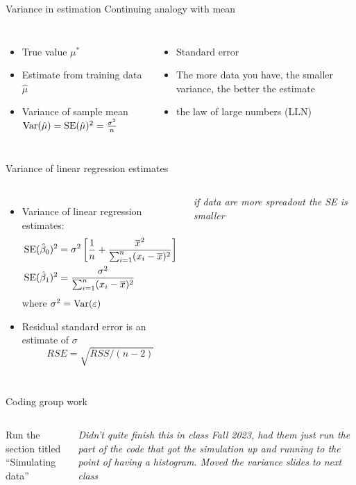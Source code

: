 \documentclass[aspectratio=169,usenames,dvipsnames]{beamer}
\newcommand{\InstructorNotes}[1]{\textit{\color{orange}#1}}
\newcommand{\InstructorList}[1]{
\begin{itemize}
	\color{orange}
	#1
\end{itemize}
}
\begin{document}
\begin{frame}[t]{Variance in estimation}
	{Continuing analogy with mean}

\begin{columns}
\centering

\begin{itemize}
	\item True value $\mu^*$
	\item Estimate from training data $\hat \mu$
	\item Variance of sample mean $\mathrm{Var}(\hat \mu) = \mathrm{SE}(\hat \mu)^2 = \frac{\sigma^2}{n}$
	\end{itemize}
\InstructorList{
  \item Standard error 
  \item The more data you have, the smaller variance, the better the estimate 
  \item the law of large numbers (LLN)
}
\end{columns}

\end{frame}
\begin{frame}[t]{Variance of linear regression estimates }
\begin{columns}
\centering
\centering
\begin{itemize}
	\item Variance of linear regression estimates:
	\begin{align*}
		\mathrm{SE}(\hat \beta_0)^2
				&= \sigma^2 \left[ \frac{1}{n} + \frac{\overline x^2}{\sum_{i=1}^n (x_i - \overline x)^2}\right]\\
		\mathrm{SE}(\hat \beta_1)^2 &= \frac{\sigma^2}{\sum_{i=1}^n (x_i - \overline x)^2}
	\end{align*}
	where $\sigma^2 = \mathrm{Var}(\varepsilon)$
	\item Residual standard error is an estimate of $\sigma$
	\begin{equation*}
		RSE = \sqrt{RSS/ (n-2)}
	\end{equation*}
\end{itemize}
\centering
\InstructorNotes{if data are more spreadout the SE is smaller}

\end{columns}
\end{frame}
{
\begin{frame}[t]{Coding group work}
\begin{columns}
\centering
Run the section titled ``Simulating data''

\centering
\InstructorNotes{Didn't quite finish this in class Fall 2023, had them just run the part of the code that got the simulation up and running to the point of having a histogram. Moved the variance slides to next class}
\end{columns}
\end{frame}
}
\end{document}
